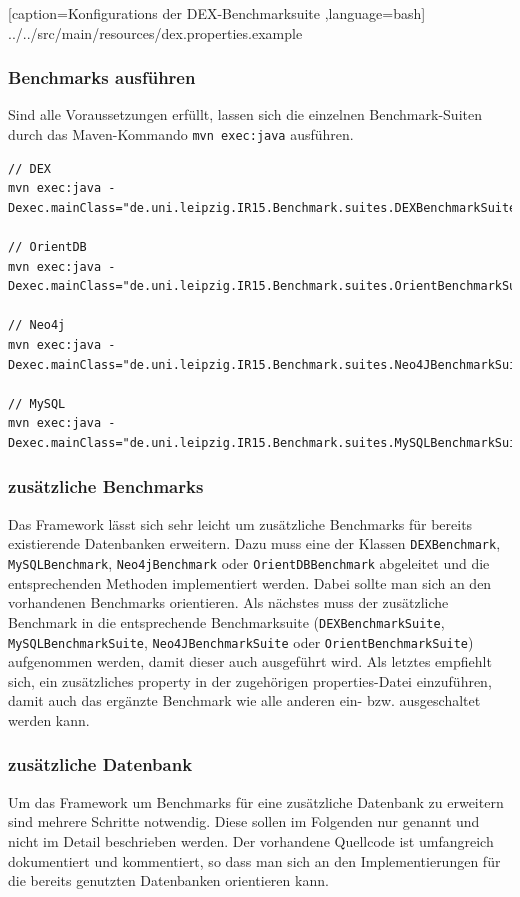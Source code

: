 \documentclass[11pt, a4paper, oneside]{article} %
\begin{document}

    [caption={Konfigurations der DEX-Benchmarksuite}
       \label{lst:inst_conf},language=bash]
 {../../src/main/resources/dex.properties.example}

\subsubsection{Benchmarks ausführen}
Sind alle Voraussetzungen erfüllt, lassen sich die einzelnen Benchmark-Suiten durch das Maven-Kommando \texttt{mvn exec:java} ausführen.

\begin{lstlisting}[caption={Ausführen der einzelnen Benchmarksuites},label={lst:inst_run}]
// DEX
mvn exec:java -Dexec.mainClass="de.uni.leipzig.IR15.Benchmark.suites.DEXBenchmarkSuite"

// OrientDB
mvn exec:java -Dexec.mainClass="de.uni.leipzig.IR15.Benchmark.suites.OrientBenchmarkSuite"

// Neo4j
mvn exec:java -Dexec.mainClass="de.uni.leipzig.IR15.Benchmark.suites.Neo4JBenchmarkSuite"

// MySQL
mvn exec:java -Dexec.mainClass="de.uni.leipzig.IR15.Benchmark.suites.MySQLBenchmarkSuite"
\end{lstlisting}

\subsubsection{zusätzliche Benchmarks}
Das Framework lässt sich sehr leicht um zusätzliche Benchmarks für bereits existierende Datenbanken erweitern. Dazu muss eine der Klassen \texttt{DEXBenchmark}, \texttt{MySQLBenchmark}, \texttt{Neo4jBenchmark} oder \texttt{OrientDBBenchmark} abgeleitet und die entsprechenden Methoden implementiert werden. Dabei sollte man sich an den vorhandenen Benchmarks orientieren. Als nächstes muss der zusätzliche Benchmark in die entsprechende Benchmarksuite (\texttt{DEXBenchmarkSuite}, \linebreak\texttt{MySQLBenchmarkSuite}, \texttt{Neo4JBenchmarkSuite} oder \texttt{OrientBenchmarkSuite}) aufgenommen werden, damit dieser auch ausgeführt wird. Als letztes empfiehlt sich, ein zusätzliches property in der zugehörigen properties-Datei einzuführen, damit auch das ergänzte Benchmark wie alle anderen ein- bzw. ausgeschaltet werden kann.

\subsubsection{zusätzliche Datenbank}
Um das Framework um Benchmarks für eine zusätzliche Datenbank zu erweitern sind mehrere Schritte notwendig. Diese sollen im Folgenden nur genannt und nicht im Detail beschrieben werden. Der vorhandene Quellcode ist umfangreich dokumentiert und kommentiert, so dass man sich an den Implementierungen für die bereits genutzten Datenbanken orientieren kann. 
\end{document}
